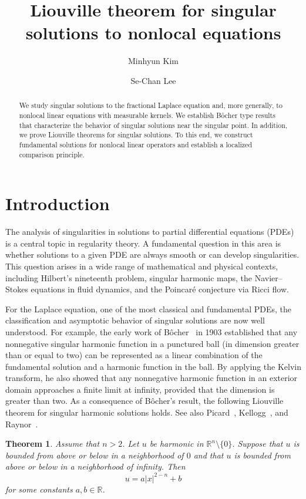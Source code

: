 \documentclass[11pt]{amsart}
\title[Liouville theorem for singular solutions to nonlocal equations]{Liouville theorem for singular solutions to nonlocal equations}
\author{Minhyun Kim}
\author{Se-Chan Lee}
\theoremstyle{plain}
\newtheorem{theorem}{Theorem}[section]
\theoremstyle{definition}
\numberwithin{equation}{section}
\begin{document}
	\begin{abstract}
        We study singular solutions to the fractional Laplace equation and, more generally, to nonlocal linear equations with measurable kernels. We establish B\^ocher type results that characterize the behavior of singular solutions near the singular point. In addition, we prove Liouville theorems for singular solutions. To this end, we construct fundamental solutions for nonlocal linear operators and establish a localized comparison principle.
	\end{abstract}
	
	\maketitle

\section{Introduction}

The analysis of singularities in solutions to partial differential equations (PDEs) is a central topic in regularity theory. A fundamental question in this area is whether solutions to a given PDE are always smooth or can develop singularities. This question arises in a wide range of mathematical and physical contexts, including Hilbert’s nineteenth problem, singular harmonic maps, the Navier--Stokes equations in fluid dynamics, and the Poincar\'e conjecture via Ricci flow.

For the Laplace equation, one of the most classical and fundamental PDEs, the classification and asymptotic behavior of singular solutions are now well understood. For example, the early work of B\^ocher~\cite{Boc03} in 1903 established that any nonnegative singular harmonic function in a punctured ball (in dimension greater than or equal to two) can be represented as a linear combination of the fundamental solution and a harmonic function in the ball. By applying the Kelvin transform, he also showed that any nonnegative harmonic function in an exterior domain approaches a finite limit at infinity, provided that the dimension is greater than two. As a consequence of B\^ocher's result, the following Liouville theorem for singular harmonic solutions holds. See also Picard~\cite{Pic24}, Kellogg~\cite{Kel26}, and Raynor~\cite{Ray26}.

\begin{theorem}\cite{Boc03}\label{thm-sing-Liouv-Lap}
Assume that $n>2$. Let $u$ be harmonic in $\mathbb{R}^n \setminus \{0\}$. Suppose that $u$ is bounded from above or below in a neighborhood of $0$ and that $u$ is bounded from above or below in a neighborhood of infinity. Then
\begin{equation*}
u=a|x|^{2-n}+b
\end{equation*}
for some constants $a, b \in \mathbb{R}$.
\end{theorem}
\end{document}
